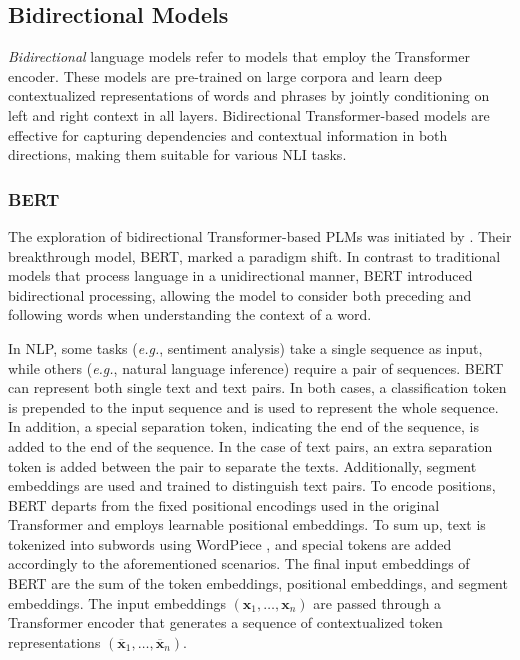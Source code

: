 \subsection{Bidirectional Models}

\textit{Bidirectional} language models refer to models that employ the Transformer encoder. These models are pre-trained on large corpora and learn deep contextualized representations of words and phrases by jointly conditioning on left and right context in all layers. Bidirectional Transformer-based models are effective for capturing dependencies and contextual information in both directions, making them suitable for various \ac{NLI} tasks. 

\subsubsection{BERT}

The exploration of bidirectional Transformer-based \acp{PLM} was initiated by \citet{devlin2018bert}. Their breakthrough model, \ac{BERT}, marked a paradigm shift. In contrast to traditional models that process language in a unidirectional manner, \ac{BERT} introduced bidirectional processing, allowing the model to consider both preceding and following words when understanding the context of a word. 


In \ac{NLP}, some tasks (\textit{e.g.}, sentiment analysis) take a single sequence as input, while others (\textit{e.g.}, natural language inference) require a pair of sequences. \ac{BERT} can represent both single text and text pairs. In both cases, a classification token is prepended to the input sequence and is used to represent the whole sequence. In addition, a special separation token, indicating the end of the sequence, is added to the end of the sequence. In the case of text pairs, an extra separation token is added between the pair to separate the texts. Additionally, segment embeddings are used and trained to distinguish text pairs. To encode positions, \ac{BERT} departs from the fixed positional encodings used in the original Transformer and employs learnable positional embeddings. To sum up, text is tokenized into subwords using WordPiece \citep{wu2016google}, and special tokens are added accordingly to the aforementioned scenarios. The final input embeddings of \ac{BERT} are the sum of the token embeddings, positional embeddings, and segment embeddings. The input embeddings $(\bm{x}_1, \ldots, \bm{x}_n)$ are passed through a Transformer encoder that generates a sequence of contextualized token representations $(\overline{\bm{x}}_1, \ldots, \overline{\bm{x}}_n)$.

